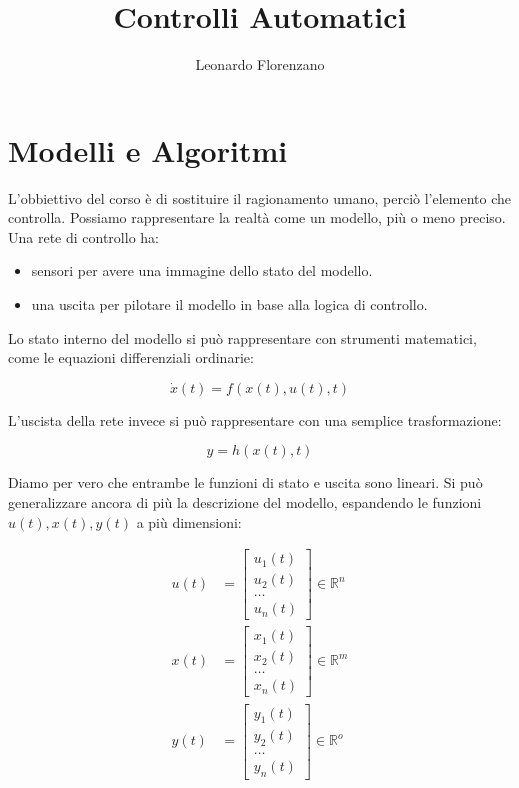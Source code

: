 \documentclass{article}
\title{Controlli Automatici}
\author{Leonardo Florenzano}
\begin{document}
\maketitle

\section{Modelli e Algoritmi}

L'obbiettivo del corso è di sostituire il ragionamento umano, perciò l'elemento che controlla.
Possiamo rappresentare la realtà come un modello, più o meno preciso.
Una rete di controllo ha:

\begin{itemize}
\item sensori per avere una immagine dello stato del modello.
\item una uscita per pilotare il modello in base alla logica di controllo.
\end{itemize}

Lo stato interno del modello si può rappresentare con strumenti matematici, come le equazioni differenziali ordinarie:

\[ \dot{x}(t) = f(x(t), u(t), t) \]

L'uscista della rete invece si può rappresentare con una semplice trasformazione:

\[ y = h(x(t), t) \]

Diamo per vero che entrambe le funzioni di stato e uscita sono lineari.
Si può generalizzare ancora di più la descrizione del modello, espandendo le funzioni \(u(t), x(t), y(t)\) a più dimensioni:

\begin{align*}
  u(t) &= \begin{bmatrix} u_1(t) \\ u_2(t) \\ \dots \\ u_n(t) \end{bmatrix} \in \mathbb{R}^n\\
  x(t) &= \begin{bmatrix} x_1(t) \\ x_2(t) \\ \dots \\ x_n(t) \end{bmatrix} \in \mathbb{R}^m\\
  y(t) &= \begin{bmatrix} y_1(t) \\ y_2(t) \\ \dots \\ y_n(t) \end{bmatrix} \in \mathbb{R}^o
\end{align*}
\end{document}
